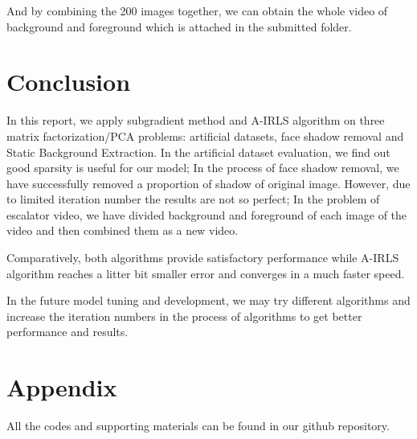 \documentclass[conference]{IEEEtran}
\begin{document}
And by combining the 200 images together, we can obtain the whole video of background and foreground which is attached in the submitted folder.

\section{Conclusion}
In this report, we apply subgradient method and A-IRLS algorithm on three matrix factorization/PCA problems: artificial datasets, face shadow removal and Static Background Extraction. In the artificial dataset evaluation, we find out good sparsity is useful for our model; In the process of face shadow removal, we have successfully removed a proportion of shadow of original image. However, due to limited iteration number the results are not so perfect; In the problem of escalator video, we have divided background and foreground of each image of the video and then combined them as a new video.

Comparatively, both algorithms provide satisfactory performance while A-IRLS algorithm reaches a litter bit smaller error and converges in a much faster speed.

In the future model tuning and development, we may try different algorithms and increase the iteration numbers in the process of algorithms to get better performance and results. 




\section*{Appendix}
All the codes and supporting materials can be found in our github repository.
\end{document}
